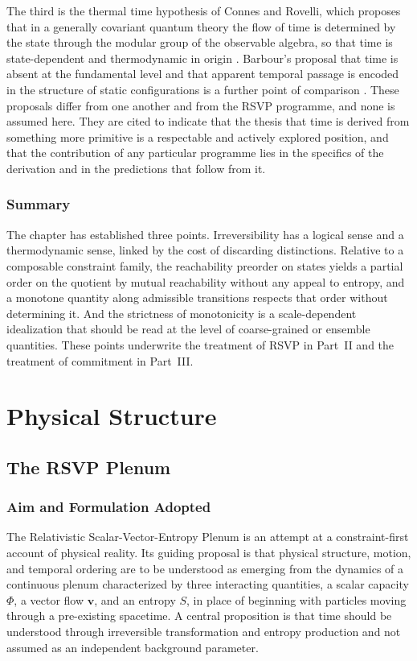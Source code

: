 \documentclass[11pt,twoside,openright]{book}
\theoremstyle{plain}
\theoremstyle{definition}
\theoremstyle{remark}
\newcommand{\rsvp}{RSVP}
\begin{document}
The third is the thermal time hypothesis of Connes and Rovelli, which proposes that in a generally covariant quantum theory the flow of time is determined by the state through the modular group of the observable algebra, so that time is state-dependent and thermodynamic in origin \cite{connesrovelli1994}. Barbour's proposal that time is absent at the fundamental level and that apparent temporal passage is encoded in the structure of static configurations is a further point of comparison \cite{barbour1999}. These proposals differ from one another and from the \rsvp{} programme, and none is assumed here. They are cited to indicate that the thesis that time is derived from something more primitive is a respectable and actively explored position, and that the contribution of any particular programme lies in the specifics of the derivation and in the predictions that follow from it.

\section{Summary}

The chapter has established three points. Irreversibility has a logical sense and a thermodynamic sense, linked by the cost of discarding distinctions. Relative to a composable constraint family, the reachability preorder on states yields a partial order on the quotient by mutual reachability without any appeal to entropy, and a monotone quantity along admissible transitions respects that order without determining it. And the strictness of monotonicity is a scale-dependent idealization that should be read at the level of coarse-grained or ensemble quantities. These points underwrite the treatment of \rsvp{} in Part~II and the treatment of commitment in Part~III.
\part{Physical Structure}

\chapter{The RSVP Plenum}
\label{ch:rsvp}

\section{Aim and Formulation Adopted}

The Relativistic Scalar-Vector-Entropy Plenum is an attempt at a constraint-first account of physical reality. Its guiding proposal is that physical structure, motion, and temporal ordering are to be understood as emerging from the dynamics of a continuous plenum characterized by three interacting quantities, a scalar capacity $\Phi$, a vector flow $\mathbf{v}$, and an entropy $S$, in place of beginning with particles moving through a pre-existing spacetime. A central proposition is that time should be understood through irreversible transformation and entropy production and not assumed as an independent background parameter.
\end{document}
